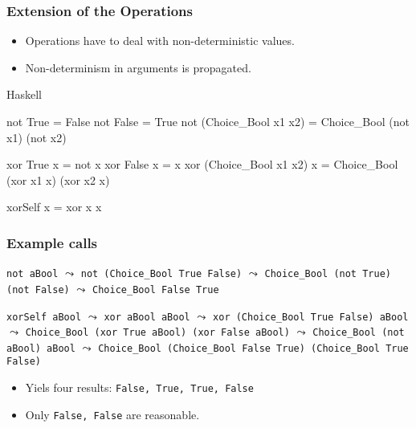 \documentclass[utf8,handout]{beamer}
\begin{document}
\begin{frame}[fragile]
\frametitle{Extension of the Operations}
\begin{itemize}
  \item Operations have to deal with non-deterministic values.
  \item Non-determinism in arguments is propagated.
\end{itemize}

\begin{block}{Haskell}
\begin{semiverbatim}
not True                = False
not False               = True
not (Choice_Bool x1 x2) = Choice_Bool (not x1) (not x2)

xor True                x = not x
xor False               x = x
xor (Choice_Bool x1 x2) x = Choice_Bool (xor x1 x)
                                        (xor x2 x)

xorSelf x = xor x x
\end{semiverbatim}
\end{block}
\end{frame}


\begin{frame}[fragile]
\frametitle{Example calls}
\begin{example}
\verb!not aBool!
$\leadsto$ \verb!not (Choice_Bool True False)!
$\leadsto$ \verb!Choice_Bool (not True) (not False)!
$\leadsto$ \verb!Choice_Bool False True!
\end{example}

\begin{example}
\verb!xorSelf aBool!
$\leadsto$ \verb!xor aBool aBool!
$\leadsto$ \verb!xor (Choice_Bool True False) aBool!
$\leadsto$ \verb!Choice_Bool (xor True aBool) (xor False aBool)!
$\leadsto$ \verb!Choice_Bool (not aBool) aBool!
$\leadsto$ \verb!Choice_Bool (Choice_Bool False True) (Choice_Bool True False)!
\end{example}

\begin{itemize}
  \item Yiels four results: \verb!False, True, True, False!
  \item Only \verb!False, False! are reasonable.
\end{itemize}

\end{frame}
\end{document}
